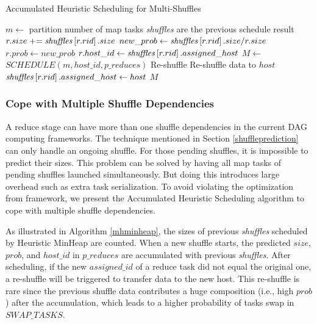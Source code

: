 \noindent
\begin{minipage}{0.95\columnwidth}
\begin{algorithm}[H]
\caption{Accumulated Heuristic Scheduling for Multi-Shuffles}
\label{mhminheap}
	\begin{algorithmic}[1]
	\small
		\State $m\gets$ partition number of map tasks
		\Comment \emph{shuffles} are the previous schedule result 
			\State $r.size \mathrel{+}= \text{\emph{shuffles}}\left[r.rid\right].size$
			\State $new\_prob\gets \text{\emph{shuffles}}\left[r.rid\right].size / r.size$
				\State $r.prob\gets new\_prob$
				\State $r.host\_id\gets \text{\emph{shuffles}}\left[r.rid\right].assigned\_host$
			\EndIf
		\EndFor
		\State $M\gets$ $SCHEDULE\left(m, host\_id, p\_reduces\right)$
			\Comment Re-shuffle
				\State Re-shuffle data to $host$
				\State $\text{\emph{shuffles}}\left[r.rid\right].assigned\_host\gets host$
				\EndIf
			\EndFor
		\EndFor
		\Return $M$
	\EndProcedure
	\end{algorithmic}
\end{algorithm}
\end{minipage}
\subsubsection{Cope with Multiple Shuffle Dependencies}
A reduce stage can have more than one shuffle dependencies in the current DAG computing frameworks. 
The technique mentioned in Section \ref{shuffleprediction} can only handle an ongoing shuffle. 
For those pending shuffles, it is impossible to predict their sizes. 
This problem can be solved by having all map tasks of pending shuffles launched simultaneously. 
But doing this introduces large overhead such as extra task serialization. 
To avoid violating the optimization from framework, we present the Accumulated Heuristic Scheduling algorithm to cope with multiple shuffle dependencies.

As illustrated in Algorithm \ref{mhminheap}, the sizes of previous \emph{shuffles} scheduled by Heuristic MinHeap are counted. 
When a new shuffle starts, the predicted $size$, $prob$, and $host\_id$ in $p\_reduces$ are accumulated with previous \emph{shuffles}. 
After scheduling, if the new $assigned\_id$ of a reduce task did not equal the original one, a re-shuffle will be triggered to transfer data to the new host. 
This re-shuffle is rare since the previous shuffle data contributes a huge composition (i.e., high $prob$) after the accumulation, 
which leads to a higher probability of tasks swap in $SWAP\_TASKS$. 



